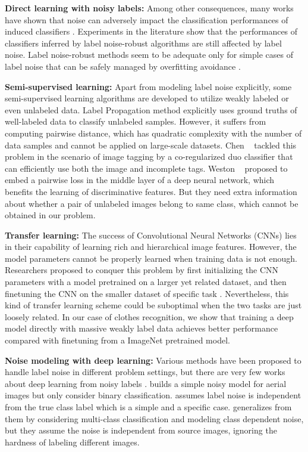 \documentclass[10pt,twocolumn,letterpaper]{article}
\begin{document}
{\bf Direct learning with noisy labels:} Among other consequences, many works have shown that noise can adversely impact the classification performances of induced classifiers \cite{zhu2004class}. 
Experiments in the literature show that the performances of classifiers inferred by label noise-robust algorithms are still affected by label noise. Label noise-robust methods seem to be adequate only for simple cases of label noise that can be safely managed by overfitting avoidance \cite{frenay2013classification}.

{\bf Semi-supervised learning:} Apart from modeling label noise explicitly, some semi-supervised learning algorithms are developed to utilize weakly labeled or even unlabeled data. Label Propagation method \cite{zhu2002learning} explicitly uses ground truths of well-labeled data to classify unlabeled samples. However, it suffers from computing pairwise distance, which has quadratic complexity with the number of data samples and cannot be applied on large-scale datasets. Chen \etal~\cite{chen2013fast} tackled this problem in the scenario of image tagging by a co-regularized duo classifier that can efficiently use both the image and incomplete tags. Weston \etal~\cite{weston2012deep} proposed to embed a pairwise loss in the middle layer of a deep neural network, which benefits the learning of discriminative features. But they need extra information about whether a pair of unlabeled images belong to same class, which cannot be obtained in our problem.

{\bf Transfer learning:} The success of Convolutional Neural Networks (CNNs) lies in their capability of learning rich and hierarchical image features. However, the model parameters cannot be properly learned when training data is not enough. Researchers proposed to conquer this problem by first initializing the CNN parameters with a model pretrained on a larger yet related dataset, and then finetuning the CNN on the smaller dataset of specific task \cite{krizhevsky2012imagenet, oquab2013learning, azizpour2014generic,donahue2013decaf}. Nevertheless, this kind of transfer learning scheme could be suboptimal when the two tasks are just loosely related. In our case of clothes recognition, we show that training a deep model directly with massive weakly label data achieves better performance compared with finetuning from a ImageNet pretrained model.

{\bf Noise modeling with deep learning:} Various methods have been proposed to handle label noise in different problem settings, but there are very few works about deep learning from noisy labels \cite{mnih2012learning, larsen1998design, sukhbaatar2014learning}. \cite{mnih2012learning} builds a simple noisy model for aerial images but only consider binary classification. \cite{larsen1998design} assumes label noise is independent from the true class label which is a simple and a specific case. \cite{sukhbaatar2014learning} generalizes from them by considering multi-class classification and modeling class dependent noise, but they assume the noise is independent from source images, ignoring the hardness of labeling different images.
\end{document}
